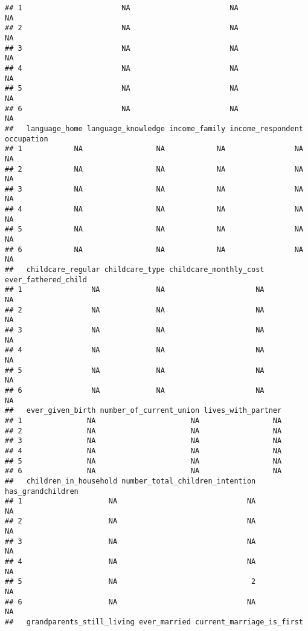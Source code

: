 \documentclass[
]{article}
\begin{document}
\begin{verbatim}
## 1                       NA                       NA                  NA
## 2                       NA                       NA                  NA
## 3                       NA                       NA                  NA
## 4                       NA                       NA                  NA
## 5                       NA                       NA                  NA
## 6                       NA                       NA                  NA
##   language_home language_knowledge income_family income_respondent occupation
## 1            NA                 NA            NA                NA         NA
## 2            NA                 NA            NA                NA         NA
## 3            NA                 NA            NA                NA         NA
## 4            NA                 NA            NA                NA         NA
## 5            NA                 NA            NA                NA         NA
## 6            NA                 NA            NA                NA         NA
##   childcare_regular childcare_type childcare_monthly_cost ever_fathered_child
## 1                NA             NA                     NA                  NA
## 2                NA             NA                     NA                  NA
## 3                NA             NA                     NA                  NA
## 4                NA             NA                     NA                  NA
## 5                NA             NA                     NA                  NA
## 6                NA             NA                     NA                  NA
##   ever_given_birth number_of_current_union lives_with_partner
## 1               NA                      NA                 NA
## 2               NA                      NA                 NA
## 3               NA                      NA                 NA
## 4               NA                      NA                 NA
## 5               NA                      NA                 NA
## 6               NA                      NA                 NA
##   children_in_household number_total_children_intention has_grandchildren
## 1                    NA                              NA                NA
## 2                    NA                              NA                NA
## 3                    NA                              NA                NA
## 4                    NA                              NA                NA
## 5                    NA                               2                NA
## 6                    NA                              NA                NA
##   grandparents_still_living ever_married current_marriage_is_first

\end{verbatim}
\end{document}
